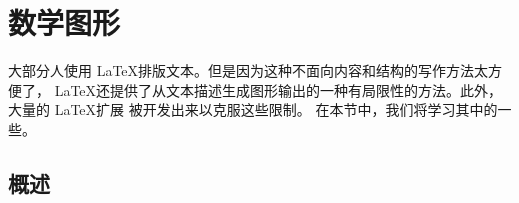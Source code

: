 \setcounter{chapter}{4}
\newcommand{\graphicscompanion}{\emph{The \LaTeX{} Graphics Companion}~\cite{graphicscompanion}}
\newcommand{\hobby}{\emph{A User's Manual for MetaPost}~\cite{metapost}}
\newcommand{\hoenig}{\emph{\TeX{} Unbound}~\cite{unbound}}
\newcommand{\graphicsinlatex}{\emph{Graphics in \LaTeXe{}}~\cite{ursoswald}}

\chapter{数学图形}
\label{chap:graphics}

\begin{intro}
大部分人使用 \LaTeX 排版文本。但是因为这种不面向内容和结构的写作方法太方便了，
\LaTeX 还提供了从文本描述生成图形输出的一种有局限性的方法。此外，大量的 \LaTeX 扩展
被开发出来以克服这些限制。 在本节中，我们将学习其中的一些。
\end{intro}
\section{概述}


